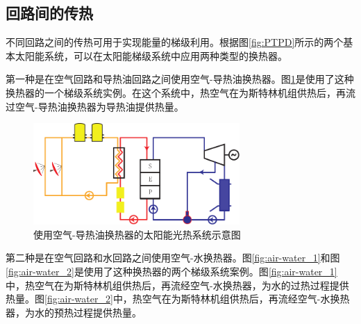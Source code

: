\subsection{回路间的传热}
\label{sec:hebc}

不同回路之间的传热可用于实现能量的梯级利用。根据图\ref{fig:PTPD}所示的两个基本太阳能系统，可以在太阳能梯级系统中应用两种类型的换热器。

第一种是在空气回路和导热油回路之间使用空气-导热油换热器。图\ref{fig:air-oil}是使用了这种换热器的一个梯级系统实例。在这个系统中，热空气在为斯特林机组供热后，再流过空气-导热油换热器为导热油提供热量。

\begin{figure}[ht]
\centering 
\includegraphics[width=0.7\textwidth]{fig/air-oil}
\caption{使用空气-导热油换热器的太阳能光热系统示意图}\label{fig:air-oil}
\end{figure}

第二种是在空气回路和水回路之间使用空气-水换热器。图\ref{fig:air-water_1}和图\ref{fig:air-water_2}是使用了这种换热器的两个梯级系统案例。图\ref{fig:air-water_1}中，热空气在为斯特林机组供热后，再流经空气-水换热器，为水的过热过程提供热量。图\ref{fig:air-water_2}中，热空气在为斯特林机组供热后，再流经空气-水换热器，为水的预热过程提供热量。

